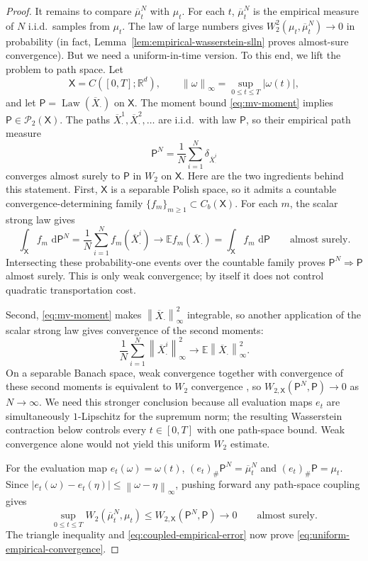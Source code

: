 \documentclass[11pt]{amsart}
\numberwithin{equation}{section}
\theoremstyle{plain}
\newcommand{\R}{\mathbb{R}}
\newcommand{\E}{\mathbb{E}}
\newcommand{\cP}{\mathcal{P}}
\newcommand{\dd}{\,\mathrm{d}}
\newcommand{\abs}[1]{\left\lvert#1\right\rvert}
\newcommand{\norm}[1]{\left\lVert#1\right\rVert}
\DeclareMathOperator{\Law}{Law}
\begin{document}
\begin{proof}
It remains to compare $\overline\mu_t^N$ with $\mu_t$.  For each $t$, $\overline\mu_t^N$ is the empirical measure of $N$ i.i.d.\ samples from $\mu_t$.  The law of large numbers gives $W_2^2(\mu_t,\overline\mu_t^N)\to 0$ in probability (in fact, Lemma~\ref{lem:empirical-wasserstein-slln} proves almost-sure convergence). But we need a uniform-in-time version.  To this end, we lift the problem to path space.
  Let
\[
 \mathsf X=C([0,T];\R^d),\qquad
 \norm{\omega}_\infty=\sup_{0\leq t\leq T}\abs{\omega(t)},
\]
and let $\mathsf P=\Law(\overline X_{\cdot})$ on $\mathsf X$.  The moment bound
\eqref{eq:mv-moment} implies $\mathsf P\in\cP_2(\mathsf X)$.  The paths
$\overline X_{\cdot}^1,\overline X_{\cdot}^2,\ldots$ are i.i.d.\ with law
$\mathsf P$, so their empirical path measure
\[
 \mathsf P^N=\frac1N\sum_{i=1}^N
 \delta_{\overline X_{\cdot}^i}
\]
converges almost surely to $\mathsf P$ in $W_2$ on $\mathsf X$.  Here are the
two ingredients behind this statement.  First, $\mathsf X$ is a separable
Polish space, so it admits a countable convergence-determining family
$\{f_m\}_{m\geq1}\subset C_b(\mathsf X)$.  For each $m$, the scalar strong law
gives
\[
 \int_{\mathsf X}f_m\,\dd\mathsf P^N
 =\frac1N\sum_{i=1}^Nf_m(\overline X_{\cdot}^i)
 \longrightarrow\E f_m(\overline X_{\cdot})
 =\int_{\mathsf X}f_m\,\dd\mathsf P
 \qquad\text{almost surely}.
\]
Intersecting these probability-one events over the countable family proves
$\mathsf P^N\Rightarrow\mathsf P$ almost surely.  This is only weak
convergence; by itself it does not control quadratic transportation cost.

Second, \eqref{eq:mv-moment} makes
$\norm{\overline X_{\cdot}}_\infty^2$ integrable, so another application of
the scalar strong law gives convergence of the second moments:
\[
 \frac1N\sum_{i=1}^N\norm{\overline X_{\cdot}^i}_\infty^2
 \longrightarrow
 \E\norm{\overline X_{\cdot}}_\infty^2.
\]
On a separable Banach space, weak convergence together with convergence of
these second moments is equivalent to $W_2$ convergence
\cite[Theorem~6.9]{Villani2009}, so $W_{2,\mathsf X}(\mathsf P^N,\mathsf P)\to 0$ as $N\to\infty$.  We need this stronger conclusion because all
evaluation maps $e_t$ are simultaneously $1$-Lipschitz for the supremum norm;
the resulting Wasserstein contraction below controls every $t\in[0,T]$ with
one path-space bound.  Weak convergence alone would not yield this uniform
$W_2$ estimate.

For the evaluation map $e_t(\omega)=\omega(t)$,
$(e_t)_\#\mathsf P^N=\overline\mu_t^N$ and
$(e_t)_\#\mathsf P=\mu_t$.  Since
$\abs{e_t(\omega)-e_t(\eta)}\leq\norm{\omega-\eta}_\infty$, pushing forward
any path-space coupling gives
\[
 \sup_{0\leq t\leq T}W_2(\overline\mu_t^N,\mu_t)
 \leq W_{2,\mathsf X}(\mathsf P^N,\mathsf P)
 \longrightarrow0
 \qquad\text{almost surely}.
\]
The triangle inequality and \eqref{eq:coupled-empirical-error} now prove
\eqref{eq:uniform-empirical-convergence}.


\end{proof}
\end{document}
